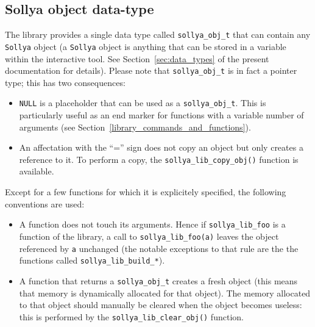 \documentclass[a4paper]{article}
\newcommand{\sollya}{\texttt{Sollya}\xspace}
\begin{document}
 \subsection{Sollya object data-type}
The library provides a single data type called \texttt{sollya\_obj\_t} that can contain any \sollya object (a \sollya object is anything that can be stored in a variable within the interactive tool. See Section~\ref{sec:data_types} of the present documentation for details). Please note that \texttt{sollya\_obj\_t} is in fact a pointer type; this has two consequences:
\begin{itemize}
\item \texttt{NULL} is a placeholder that can be used as a \texttt{sollya\_obj\_t}. This is particularly useful as an end marker for functions with a variable number of arguments (see Section~\ref{library_commands_and_functions}).
\item An affectation with the ``='' sign does not copy an object but only creates a reference to it. To perform a copy, the \texttt{sollya\_lib\_copy\_obj()} function is available.
\end{itemize}
Except for a few functions for which it is explicitely specified, the following conventions are used:
\begin{itemize}
\item  A function does not touch its arguments. Hence if \texttt{sollya\_lib\_foo} is a function of the library, a call to \texttt{sollya\_lib\_foo(a)} leaves the object referenced by \texttt{a} unchanged (the notable exceptions to that rule are the the functions called \texttt{sollya\_lib\_build\_*}).
\item A function that returns a \texttt{sollya\_obj\_t} creates a fresh object (this means that memory is dynamically allocated for that object). The memory allocated to that object should manually be cleared when the object becomes useless: this is performed by the \texttt{sollya\_lib\_clear\_obj()} function.
\end{itemize}
\end{document}
